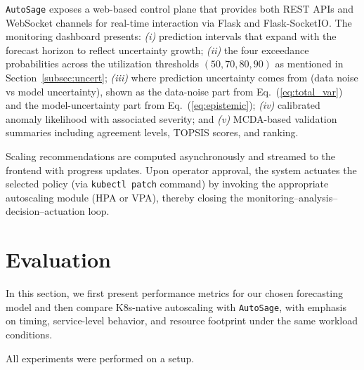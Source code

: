 \documentclass[sigconf]{acmart}
\newcommand{\Solution}{\texttt{AutoSage}}
\newcommand{\cz}[1]{{\color{brown}{#1}}}
\begin{document}
\Solution{} exposes a web-based control plane that provides both REST APIs and WebSocket channels for real-time interaction via Flask and Flask-SocketIO. The monitoring dashboard presents: \textit{(i)} prediction intervals that expand with the forecast horizon to reflect uncertainty growth; \textit{(ii)} the four exceedance probabilities across the utilization thresholds $(50, 70, 80, 90)$ as mentioned in Section~\ref{subsec:uncert}; 
\textit{(iii)} where prediction uncertainty comes from (data noise vs model uncertainty), shown as the data-noise part from Eq.~(\ref{eq:total_var}) and the model-uncertainty part from Eq.~(\ref{eq:epistemic}); 
\textit{(iv)} calibrated anomaly likelihood with associated severity; 
and \textit{(v)} MCDA-based validation summaries including agreement levels, TOPSIS scores, and ranking.

Scaling recommendations are computed asynchronously and streamed to the frontend with progress updates. Upon operator approval, the system actuates the selected policy (via \texttt{kubectl~patch} command) by invoking the appropriate autoscaling module (HPA or VPA), thereby closing the monitoring–analysis–decision–actuation loop.

\section{Evaluation}
\label{sec:evaluation}

In this section, we first present performance metrics for our chosen forecasting model and then compare K8s-native autoscaling with \Solution{}, with emphasis on timing, service-level behavior, and resource footprint under the same workload conditions.

All experiments were performed on a
\cz{CPU SPECS GPU SPECS HERE} setup.
\end{document}
